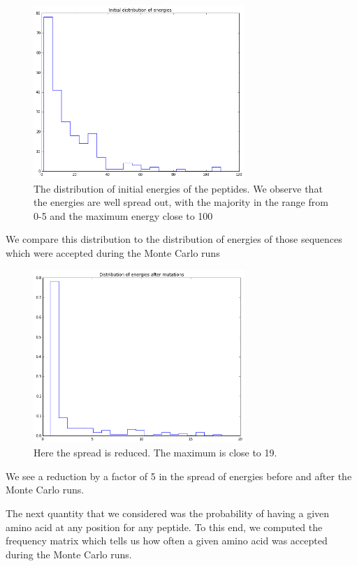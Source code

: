 \documentclass[a4paper, 12pt]{article}
\begin{document}
 	\begin{figure}
 	\label{hist_ini_energies}
 	\centering
 	\includegraphics[width=8cm]{Images/hist_ini_energies.png}
 	\caption{The distribution of initial energies of the peptides. We observe that the energies are well spread out, with the majority in the range from 0-5 and the maximum energy close to 100}
 	\end{figure}

 	We compare this distribution to the distribution of energies of those sequences which were accepted during the Monte Carlo runs

 	\begin{figure}[!h]
 	\label{hist_final_energies} 
 	\centering
 	\includegraphics[width=8cm]{Images/hist_fin_energies.png}
 	\caption{Here the spread is reduced. The maximum is close to 19.}
 	\end{figure} 

 	We see a reduction by a factor of 5 in the spread of energies before and after the Monte Carlo runs.

 	The next quantity that we considered was the probability of having a given amino acid at any position for any peptide. To this end, we computed the frequency matrix which tells us how often a given amino acid was accepted during the Monte Carlo runs. 
\end{document}
